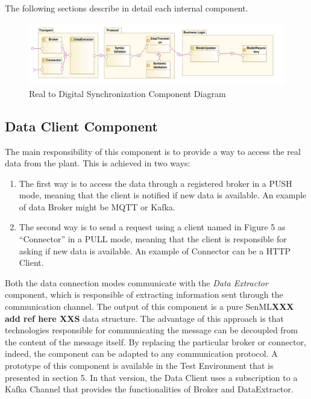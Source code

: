 The following sections describe in detail each internal component.


\begin{figure}
  \includegraphics[width=\linewidth]{images/diagramComponent.PNG}
  \caption{Real to Digital Synchronization Component Diagram}
  \label{fig:realToDigitalComponentDia}
\end{figure}

\subsection{Data Client Component}
The main responsibility of this component is to provide a way to access the real data from the plant. This is achieved in two ways:
\begin{enumerate}
\item The first way is to access the data through a registered broker in a PUSH mode, meaning that the client is notified if new data is available. 
An example of data Broker might be MQTT or Kafka.
\item The second way is to send a request using a client named in Figure 5 as “Connector” in a PULL mode, meaning that the client is responsible for asking if new data is available. An example of Connector can be a HTTP Client.
\end{enumerate}
Both the data connection modes communicate with the \textit{Data Extractor} component, which is responsible of extracting information sent through the communication channel. 
The output of this component is a pure SenML\textbf{XXX add ref here XXS} data structure. 
The advantage of this approach is that technologies responsible for communicating the message can be decoupled from the content of the message itself. 
By replacing the particular broker or connector, indeed, the component can be adapted to any communication protocol. 
A prototype of this component is available in the Test Environment that is presented in section  5. In that version, the Data Client uses a subscription to a Kafka Channel that provides the functionalities of Broker and DataExtractor.


